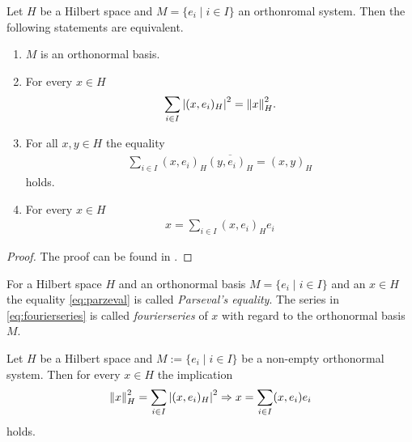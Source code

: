 \begin{theorem}
	Let $H$ be a Hilbert space and $M = \{e_i \mid i \in I\}$ an orthonromal system. Then the following statements are equivalent.
	\begin{enumerate}
		\item $M$ is an orthonormal basis.
		
		\item For every $x \in H$
		\begin{align}\label{eq:parzeval}
		\sum_{i \in I} \vbraces{(x, e_i)_H}^2 = \norm[H]{x}^2.
		\end{align}
		
		\item For all $x,y \in H$ the equality
		\begin{align*}
			\sum_{i \in I} (x, e_i)_H \overline{(y,e_i)_H} = (x,y)_H
		\end{align*}
		holds.
		
		\item For every $x \in H$  
		\begin{align} \label{eq:fourierseries}
		x = \sum_{i \in I} (x, e_i)_H e_i
		\end{align}
	\end{enumerate} 
\end{theorem}


\begin{proof}
	The proof can be found in \cite[p. 54]{FAna1}.
\end{proof}


\begin{definition}
	For a Hilbert space $H$ and an orthonormal basis $M = \{e_i \mid i \in I\}$ and an $x \in H$ the equality \eqref{eq:parzeval} is called \textit{Parseval's equality}. The series in \eqref{eq:fourierseries} is called \textit{fourierseries} of $x$ with regard to the orthonormal basis $M$. 
\end{definition}

\begin{lemma}
	Let $H$ be a Hilbert space and $M := \{e_i \mid i \in I\}$ be a non-empty orthonormal system. Then for every $x \in H$ the implication
	\begin{align}
		\norm[H]{x}^2 = \sum_{i \in I} \vbraces{(x, e_i)_H}^2 \Rightarrow x = \sum_{i \in I} (x,e_i) e_i \label{eq:parceval_to_fourier}
	\end{align}
	holds.
\end{lemma}

